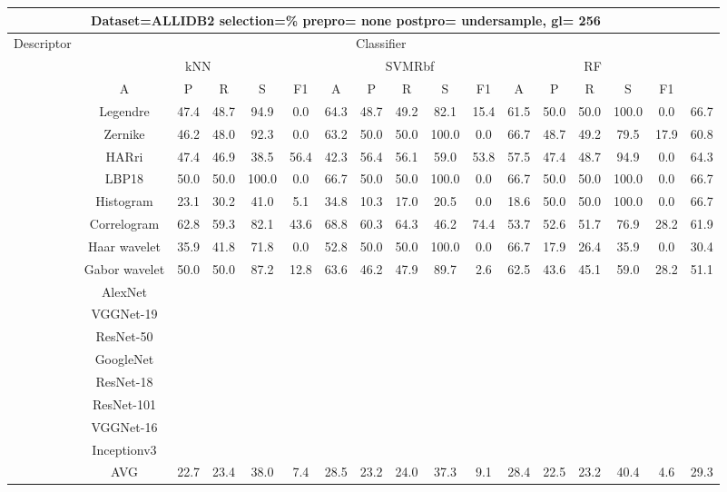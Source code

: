 \documentclass[12pt,italian]{article}
\begin{document}
\begin{tiny}
\begin{longtable}{lcccccccccccccccc}
\toprule
\multicolumn{16}{c}{Dataset=ALLIDB2 selection=\% prepro= none postpro= undersample, gl= 256} \\ 
\toprule
Descriptor & \multicolumn{15}{c}{Classifier} \\ 
& \multicolumn{5}{c}{kNN} & \multicolumn{5}{c}{SVMRbf} & \multicolumn{5}{c}{RF} \\ 
& A & P & R & S & F1 & A & P & R & S & F1 & A & P & R & S & F1 \\ 
\midrule
& Legendre & 47.4 & 48.7 & 94.9 &  0.0 & 64.3 & 48.7 & 49.2 & 82.1 & 15.4 & 61.5 & 50.0 & 50.0 & 100.0 &  0.0 & 66.7 \\ 
& Zernike & 46.2 & 48.0 & 92.3 &  0.0 & 63.2 & 50.0 & 50.0 & 100.0 &  0.0 & 66.7 & 48.7 & 49.2 & 79.5 & 17.9 & 60.8 \\ 
& HARri & 47.4 & 46.9 & 38.5 & 56.4 & 42.3 & 56.4 & 56.1 & 59.0 & 53.8 & 57.5 & 47.4 & 48.7 & 94.9 &  0.0 & 64.3 \\ 
& LBP18 & 50.0 & 50.0 & 100.0 &  0.0 & 66.7 & 50.0 & 50.0 & 100.0 &  0.0 & 66.7 & 50.0 & 50.0 & 100.0 &  0.0 & 66.7 \\ 
& Histogram & 23.1 & 30.2 & 41.0 &  5.1 & 34.8 & 10.3 & 17.0 & 20.5 &  0.0 & 18.6 & 50.0 & 50.0 & 100.0 &  0.0 & 66.7 \\ 
& Correlogram & 62.8 & 59.3 & 82.1 & 43.6 & 68.8 & 60.3 & 64.3 & 46.2 & 74.4 & 53.7 & 52.6 & 51.7 & 76.9 & 28.2 & 61.9 \\ 
& Haar wavelet & 35.9 & 41.8 & 71.8 &  0.0 & 52.8 & 50.0 & 50.0 & 100.0 &  0.0 & 66.7 & 17.9 & 26.4 & 35.9 &  0.0 & 30.4 \\ 
& Gabor wavelet & 50.0 & 50.0 & 87.2 & 12.8 & 63.6 & 46.2 & 47.9 & 89.7 &  2.6 & 62.5 & 43.6 & 45.1 & 59.0 & 28.2 & 51.1 \\ 
& AlexNet \\ 
& VGGNet-19 \\ 
& ResNet-50 \\ 
& GoogleNet \\ 
& ResNet-18 \\ 
& ResNet-101 \\ 
& VGGNet-16 \\ 
& Inceptionv3 \\ 
\hline
& AVG & 22.7 & 23.4 & 38.0 &  7.4 & 28.5 & 23.2 & 24.0 & 37.3 &  9.1 & 28.4 & 22.5 & 23.2 & 40.4 &  4.6 & 29.3 \\ 
\hline
\bottomrule
\end{longtable} 


\end{tiny}
\end{document}
